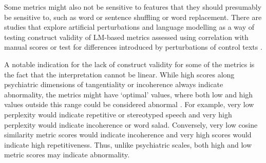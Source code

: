 

Some metrics might also not be sensitive to features that they should presumably be sensitive to, such as word or sentence shuffling or word replacement. There are studies that explore artificial perturbations and language modelling as a way of testing construct validity of LM-based metrics assessed using correlation with manual scores \citep{fradkin2023theory} or test for differences introduced by perturbations of control texts \citep{bedi2015automated, hitczenko2021understanding}.

A notable indication for the lack of construct validity for some of the metrics is the fact that the interpretation cannot be linear. While high scores along psychiatric dimensions of tangentiality or incoherence always indicate abnormality, the metrics might have `optimal' values, where both low and high values outside this range could be considered abnormal \citep{fradkin2023theory}. For example, very low perplexity would indicate repetitive or stereotyped speech and very high perplexity would indicate incoherence or word salad. Conversely, very low cosine similarity metric scores would indicate incoherence and very high scores would indicate high repetitiveness. Thus, unlike psychiatric scales, both high and low metric scores may indicate abnormality.

